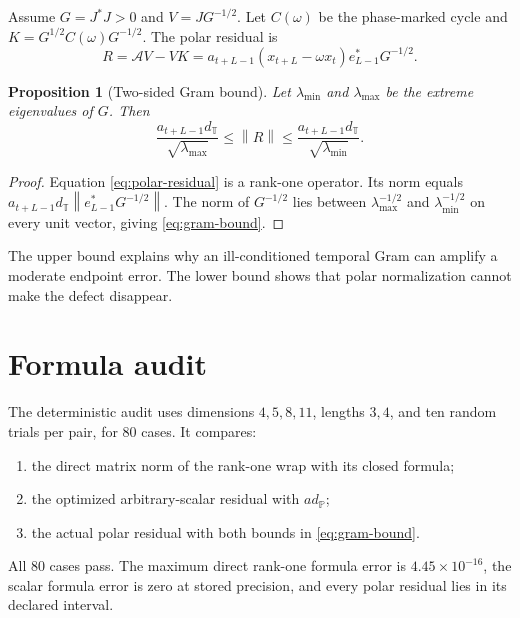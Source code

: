 \documentclass[12pt]{article}
\newtheorem{proposition}[theorem]{Proposition}
\theoremstyle{remark}
\newcommand{\norm}[1]{\left\lVert#1\right\rVert}
\begin{document}
Assume $G=J^*J>0$ and $V=JG^{-1/2}$.  Let $C(\omega)$ be the phase-marked
cycle and $K=G^{1/2}C(\omega)G^{-1/2}$.  The polar residual is
\begin{equation}\label{eq:polar-residual}
 R=\mathcal AV-VK
 =a_{t+L-1}(x_{t+L}-\omega x_t)e_{L-1}^*G^{-1/2}.
\end{equation}

\begin{proposition}[Two-sided Gram bound]\label{prop:gram-bound}
Let $\lambda_{\min}$ and $\lambda_{\max}$ be the extreme eigenvalues of
$G$.  Then
\begin{equation}\label{eq:gram-bound}
 \frac{a_{t+L-1}d_{\mathbb T}}
 {\sqrt{\lambda_{\max}}}
 \le \norm R\le
 \frac{a_{t+L-1}d_{\mathbb T}}
 {\sqrt{\lambda_{\min}}}.
\end{equation}
\end{proposition}

\begin{proof}
Equation \eqref{eq:polar-residual} is a rank-one operator.  Its norm equals
$a_{t+L-1}d_{\mathbb T}\norm{e_{L-1}^*G^{-1/2}}$.  The norm of
$G^{-1/2}$ lies between $\lambda_{\max}^{-1/2}$ and
$\lambda_{\min}^{-1/2}$ on every unit vector, giving
\eqref{eq:gram-bound}.
\end{proof}

The upper bound explains why an ill-conditioned temporal Gram can amplify a
moderate endpoint error.  The lower bound shows that polar normalization
cannot make the defect disappear.

\section{Formula audit}

The deterministic audit uses dimensions $4,5,8,11$, lengths $3,4$, and ten
random trials per pair, for 80 cases.  It compares:
\begin{enumerate}[leftmargin=2em]
\item the direct matrix norm of the rank-one wrap with its closed formula;
\item the optimized arbitrary-scalar residual with
$a d_{\mathbb P}$;
\item the actual polar residual with both bounds in
\eqref{eq:gram-bound}.
\end{enumerate}
All 80 cases pass.  The maximum direct rank-one formula error is
$4.45\times10^{-16}$, the scalar formula error is zero at stored precision,
and every polar residual lies in its declared interval.
\end{document}
